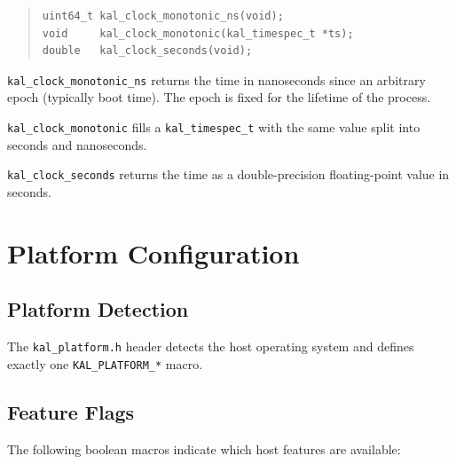 \documentclass[11pt,twoside]{article}
\begin{document}
\begin{quote}
\begin{verbatim}
uint64_t kal_clock_monotonic_ns(void);
void     kal_clock_monotonic(kal_timespec_t *ts);
double   kal_clock_seconds(void);
\end{verbatim}
\end{quote}

{\tt kal\_clock\_monotonic\_ns} returns the time in nanoseconds
since an arbitrary epoch (typically boot time).  The epoch is fixed
for the lifetime of the process.

{\tt kal\_clock\_monotonic} fills a {\tt kal\_timespec\_t} with
the same value split into seconds and nanoseconds.

{\tt kal\_clock\_seconds} returns the time as a double-precision
floating-point value in seconds.

\newpage
\section{Platform Configuration}
\label{sec:platform}

\subsection{Platform Detection}

The {\tt kal\_platform.h} header detects the host operating system
and defines exactly one {\tt KAL\_PLATFORM\_*} macro.

\subsection{Feature Flags}

The following boolean macros indicate which host features are
available:
\end{document}
